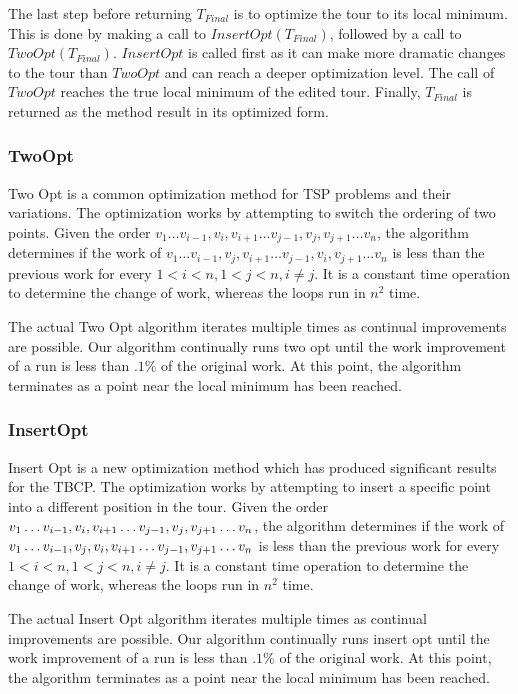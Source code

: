 \documentclass[sigconf, anonymous, pdftex]{acmart}
\begin{document}
The last step before returning $T_{Final}$ is to optimize the tour to its local minimum. This is done by making a call to $InsertOpt(T_{Final})$, followed by a call to $TwoOpt(T_{Final})$. $InsertOpt$ is called first as it can make more dramatic changes to the tour than $TwoOpt$ and can reach a deeper optimization level. The call of $TwoOpt$ reaches the true local minimum of the edited tour. Finally, $T_{Final}$ is returned as the method result in its optimized form.

\subsubsection{TwoOpt}

Two Opt is a common optimization method for TSP problems and their variations. The optimization works by attempting to switch the ordering of two points. Given the order $v_1 \dots v_{i-1}, v_i, v_{i+1} \dots v_{j-1}, v_j, v_{j+1} \dots v_n$, the algorithm determines if the work of $v_1 \dots v_{i-1}, v_j, v_{i+1} \dots v_{j-1}, v_i, v_{j+1} \dots v_n$ is less than the previous work for every $1 < i < n, 1 < j < n, i \neq j$. It is a constant time operation to determine the change of work, whereas the loops run in $n^2$ time.

The actual Two Opt algorithm iterates multiple times as continual improvements are possible. Our algorithm continually runs two opt until the work improvement of a run is less than $.1\%$ of the original work. At this point, the algorithm terminates as a point near the local minimum has been reached.

\subsubsection{InsertOpt}

Insert Opt is a new optimization method which has produced significant results for the TBCP. The optimization works by attempting to insert a specific point into a different position in the tour. Given the order $v_1 \dots v_{i-1}, v_i, v_{i+1} \dots v_{j-1}, v_j, v_{j+1}\\ \dots v_n$, the algorithm determines if the work of $v_1 \dots v_{i-1}, v_j, v_i,\\ v_{i+1} \dots v_{j-1}, v_{j+1} \dots v_n$ is less than the previous work for every $1 < i < n, 1 < j < n, i \neq j$. It is a constant time operation to determine the change of work, whereas the loops run in $n^2$ time.

The actual Insert Opt algorithm iterates multiple times as continual improvements are possible. Our algorithm continually runs insert opt until the work improvement of a run is less than $.1\%$ of the original work. At this point, the algorithm terminates as a point near the local minimum has been reached.
\end{document}
